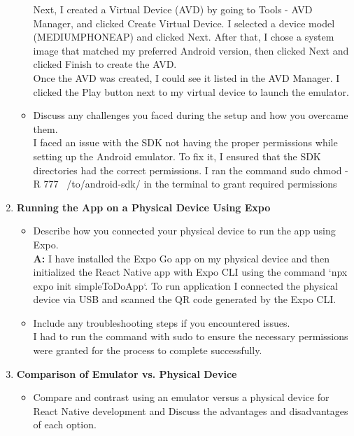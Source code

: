 \documentclass{article}
\begin{document}
\begin{enumerate}
\begin{itemize}
Next, I created a Virtual Device (AVD) by going to Tools - AVD Manager, and clicked Create Virtual Device. I selected a device model (MEDIUMPHONEAP) and clicked Next. After that, I chose a system image that matched my preferred Android version, then clicked Next and clicked Finish to create the AVD.\\
Once the AVD was created, I could see it listed in the AVD Manager. I clicked the Play button next to my virtual device to launch the emulator.\\
                    
                    
                    \item Discuss any challenges you faced during the setup and how you overcame them.\\
                    I faced an issue with the SDK not having the proper permissions while setting up the Android emulator. To fix it, I ensured that the SDK directories had the correct permissions. I ran the command sudo chmod -R 777 ~/to/android-sdk/ in the terminal to grant required permissions
                \end{itemize}
            \item \textbf{Running the App on a Physical Device Using Expo }
                \begin{itemize}
                    \item Describe how you connected your physical device to run the app using Expo.\\
                    \textbf{A:}
 I have installed the Expo Go app on my physical device and then initialized the React Native app with Expo CLI using the command `npx expo init simpleToDoApp`. To run application I connected the physical device via USB and scanned the QR code generated by the Expo CLI. 
                    \item Include any troubleshooting steps if you encountered issues.\\
                    I had to run the command with sudo to ensure the necessary permissions were granted for the process to complete successfully.
                \end{itemize}
            \item \textbf{Comparison of Emulator vs. Physical Device }
                \begin{itemize}
                    \item Compare and contrast using an emulator versus a physical device for React Native development and  Discuss the advantages and disadvantages of each option.\\

\end{itemize}
\end{enumerate}
\end{document}
